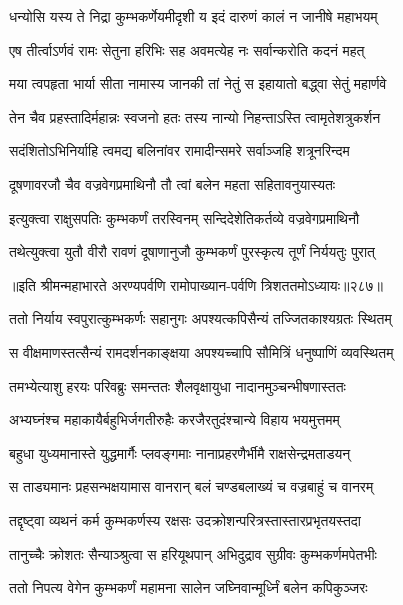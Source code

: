 \twolineshloka
{धन्योसि यस्य ते निद्रा कुम्भकर्णेयमीदृशी}
{य इदं दारुणं कालं न जानीषे महाभयम्}


\twolineshloka
{एष तीर्त्वाऽर्णवं रामः सेतुना हरिभिः सह}
{अवमत्येह नः सर्वान्करोति कदनं महत्}


\twolineshloka
{मया त्वपहृता भार्या सीता नामास्य जानकी}
{तां नेतुं स इहायातो बद्ध्वा सेतुं महार्णवे}


\twolineshloka
{तेन चैव प्रहस्तादिर्महान्नः स्वजनो हतः}
{तस्य नान्यो निहन्ताऽस्ति त्वामृतेशत्रुकर्शन}


\twolineshloka
{सदंशितोऽभिनिर्याहि त्वमद्य बलिनांवर}
{रामादीन्समरे सर्वाञ्जहि शत्रूनरिन्दम}


\twolineshloka
{दूषणावरजौ चैव वज्रवेगप्रमाथिनौ}
{तौ त्वां बलेन महता सहितावनुयास्यतः}


\twolineshloka
{इत्युक्त्वा राक्षुसपतिः कुम्भकर्णं तरस्विनम्}
{सन्दिदेशेतिकर्तव्ये वज्रवेगप्रमाथिनौ}


\twolineshloka
{तथेत्युक्त्वा युतौ वीरौ रावणं दूषाणानुजौ}
{कुम्भकर्णं पुरस्कृत्य तूर्णं निर्ययतुः पुरात्}


॥इति श्रीमन्महाभारते अरण्यपर्वणि रामोपाख्यान-पर्वणि त्रिशततमोऽध्यायः॥२८७॥




\twolineshloka
{ततो निर्याय स्वपुरात्कुम्भकर्णः सहानुगः}
{अपश्यत्कपिसैन्यं तज्जितकाश्यग्रतः स्थितम्}


\twolineshloka
{स वीक्षमाणस्तत्सैन्यं रामदर्शनकाङ्क्षया}
{अपश्यच्चापि सौमित्रिं धनुष्पाणिं व्यवस्थितम्}


\twolineshloka
{तमभ्येत्याशु हरयः परिवब्रुः समन्ततः}
{शैलवृक्षायुधा नादानमुञ्चन्भीषणास्ततः}


\twolineshloka
{अभ्यघ्नंश्च महाकायैर्बहुभिर्जगतीरुहैः}
{करजैरतुदंश्चान्ये विहाय भयमुत्तमम्}


\twolineshloka
{बहुधा युध्यमानास्ते युद्धमार्गैः प्लवङ्गमाः}
{नानाप्रहरणैर्भीमै राक्षसेन्द्रमताडयन्}


\twolineshloka
{स ताड्यमानः प्रहसन्भक्षयामास वानरान्}
{बलं चण्डबलाख्यं च वज्रबाहुं च वानरम्}


\twolineshloka
{तद्दृष्ट्वा व्यथनं कर्म कुम्भकर्णस्य रक्षसः}
{उदक्रोशन्परित्रस्तास्तारप्रभृतयस्तदा}


\twolineshloka
{तानुच्चैः क्रोशतः सैन्याञ्श्रुत्वा स हरियूथपान्}
{अभिदुद्राव सुग्रीवः कुम्भकर्णमपेतभीः}


\twolineshloka
{ततो निपत्य वेगेन कुम्भकर्णं महामना}
{सालेन जघ्निवान्मूर्ध्निं बलेन कपिकुञ्जरः}



